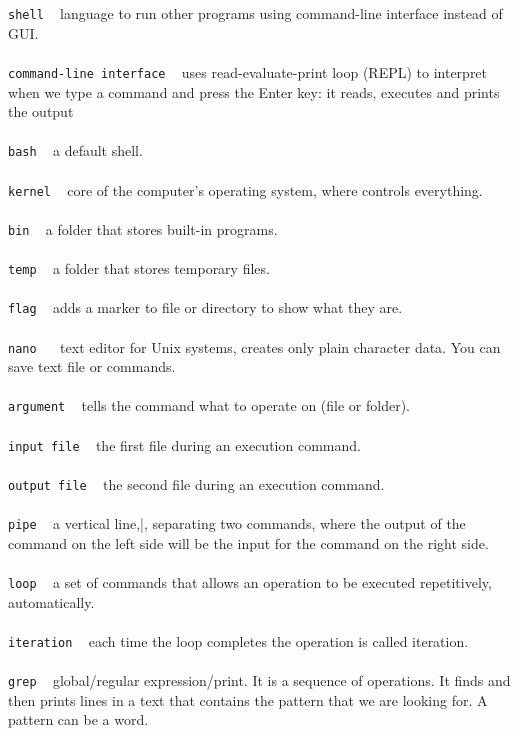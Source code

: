 \documentclass{article}
\begin{document}
\texttt{shell} ~ language to run other programs using command-line interface instead of GUI.\\
\\
\texttt{command-line interface} ~ uses read-evaluate-print loop (REPL) to interpret when we type a command and press the Enter key: it reads, executes and prints the output\\
\\
\texttt{bash} ~	a default shell.\\
\\
\texttt{kernel} ~ core of the computer's operating system, where controls everything. \\
\\
\texttt{bin} ~ a folder that stores built-in programs.\\
\\
\texttt{temp} ~ a folder that stores temporary files.\\
\\
\texttt{flag} ~ adds a marker to file or directory to show what they are.\\
\\
\texttt{nano	} ~	text editor for Unix systems, creates only plain character data. You can save text file or commands. \\
\\
\texttt{argument} ~	tells the command what to operate on (file or folder).\\
\\
\texttt{input file} ~ the first file during an execution command. \\
\\
\texttt{output file} ~ the second file during an execution command.\\
\\
\texttt{pipe} ~ a vertical line,|, separating two commands, where the output of the command on the left side will be the input for the command on the right side.\\
\\
\texttt{loop} ~ a set of commands that allows an operation to be executed repetitively, automatically.\\
\\
\texttt{iteration} ~ each time the loop completes the operation is called iteration.\\  
\\
\texttt{grep} ~ global/regular expression/print. It is a sequence of operations. It finds and then prints lines in a text that contains the pattern that we are looking for. A pattern can be a word.\\
\\
\end{document}
